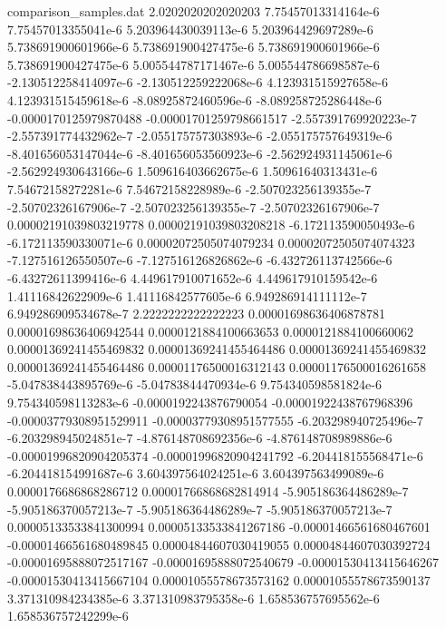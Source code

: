 \begin{filecontents}{comparison_samples.dat}
2.0202020202020203  7.75457013314164e-6     7.75457013355041e-6     5.203964430039113e-6   5.203964429697289e-6   5.738691900601966e-6   5.738691900427475e-6   5.738691900601966e-6   5.738691900427475e-6   5.005544787171467e-6   5.005544786698587e-6   -2.130512258414097e-6   -2.130512259222068e-6   4.123931515927658e-6   4.123931515459618e-6   -8.08925872460596e-6    -8.089258725286448e-6   -0.0000170125979870488  -0.00001701259798661517 -2.557391769920223e-7   -2.557391774432962e-7   -2.055175757303893e-6   -2.055175757649319e-6   -8.401656053147044e-6   -8.401656053560923e-6   -2.562924931145061e-6   -2.562924930643166e-6   1.509616403662675e-6   1.50961640313431e-6    7.54672158272281e-6    7.54672158228989e-6    -2.507023256139355e-7   -2.50702326167906e-7    -2.507023256139355e-7   -2.50702326167906e-7    0.00002191039803219778 0.00002191039803208218 -6.172113590050493e-6   -6.172113590330071e-6   0.00002072505074079234 0.00002072505074074323 -7.127516126550507e-6   -7.127516126826862e-6   -6.432726113742566e-6   -6.43272611399416e-6    4.449617910071652e-6   4.449617910159542e-6   1.41116842622909e-6    1.41116842577605e-6    6.949286914111112e-7    6.949286909534678e-7  
2.2222222222222223  0.00001698636406878781  0.00001698636406942544  0.0000121884100663653  0.0000121884100660062  0.00001369241455469832 0.00001369241455464486 0.00001369241455469832 0.00001369241455464486 0.00001176500016312143 0.00001176500016261658 -5.047838443895769e-6   -5.04783844470934e-6    9.754340598581824e-6   9.754340598113283e-6   -0.0000192243876790054  -0.00001922438767968396 -0.00003779308951529911 -0.00003779308951577555 -6.203298940725496e-7   -6.203298945024851e-7   -4.876148708692356e-6   -4.876148708989886e-6   -0.00001996820904205374 -0.00001996820904241792 -6.204418155568471e-6   -6.204418154991687e-6   3.604397564024251e-6   3.604397563499089e-6   0.0000176686868286712  0.00001766868682814914 -5.905186364486289e-7   -5.905186370057213e-7   -5.905186364486289e-7   -5.905186370057213e-7   0.00005133533841300994 0.00005133533841267186 -0.00001466561680467601 -0.00001466561680489845 0.00004844607030419055 0.00004844607030392724 -0.00001695888072517167 -0.00001695888072540679 -0.00001530413415646267 -0.00001530413415667104 0.00001055578673573162 0.00001055578673590137 3.371310984234385e-6   3.371310983795358e-6   1.658536757695562e-6    1.658536757242299e-6  

\end{filecontents}
